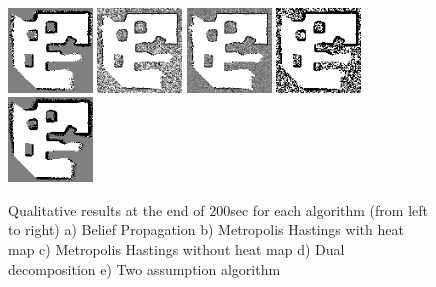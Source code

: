 \documentclass[10pt,oneside,letterpaper]{article}
\begin{document}
\begin{figure}
  \includegraphics[width=0.2\textwidth]{figures/bpresults_100x100_200sec.png}%
  \includegraphics[width=0.2\textwidth]{figures/SICKDDMCMC200sec_100x100.png}%
  \includegraphics[width=0.2\textwidth]{figures/SICKSlowMetropolis200sec_100x100.png}%
  \includegraphics[width=0.2\textwidth]{figures/dualdecomposition200sec_100x100.png}%
  \includegraphics[width=0.2\textwidth]{figures/TwoAssumptionAlgo200sec_100x100.png}%
  \caption{Qualitative results at the end of 200sec for each algorithm (from left to right) a) Belief Propagation b) Metropolis Hastings with heat map c) Metropolis Hastings without heat map d) Dual decomposition e) Two assumption algorithm}
  \label{fig:convergence-comparison-visuals}
\end{figure}
\end{document}
